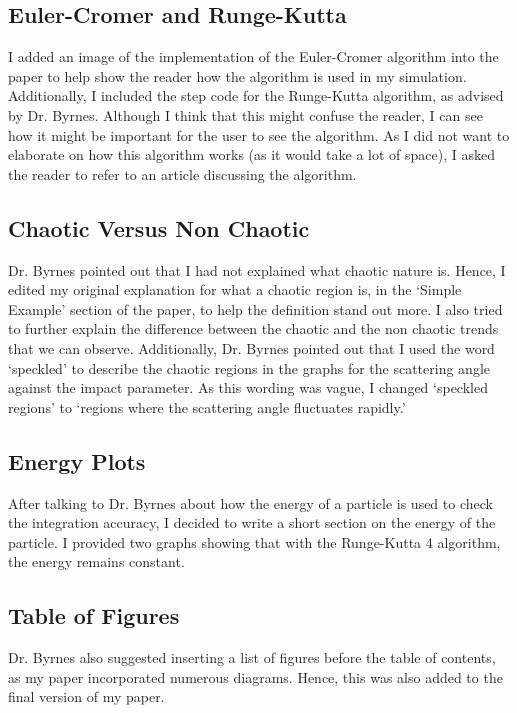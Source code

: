 \documentclass[paper=a4, fontsize=11pt]{scrartcl} %
\numberwithin{equation}{section} %
\numberwithin{figure}{section} %
\numberwithin{table}{section} %
\begin{document}
	\subsection{Euler-Cromer and Runge-Kutta}
	I added an image of the implementation of the Euler-Cromer algorithm into the paper to help show the reader how the algorithm is used in my simulation. Additionally, I included the step code for the Runge-Kutta algorithm, as advised by Dr. Byrnes. Although I think that this might confuse the reader, I can see how it might be important for the user to see the algorithm. As I did not want to elaborate on how this algorithm works (as it would take a lot of space), I asked the reader to refer to an article discussing the algorithm.
	
	\subsection{Chaotic Versus Non Chaotic}
	Dr. Byrnes pointed out that I had not explained what chaotic nature is. Hence, I edited my original explanation for what a chaotic region is, in the `Simple Example' section of the paper, to help the definition stand out more. I also tried to further explain the difference between the chaotic and the non chaotic trends that we can observe. Additionally, Dr. Byrnes pointed out that I used the word `speckled' to describe the chaotic regions in the graphs for the scattering angle against the impact parameter. As this wording was vague, I changed `speckled regions' to `regions where the scattering angle fluctuates rapidly.' 
	
	\subsection{Energy Plots}
	After talking to Dr. Byrnes about how the energy of a particle is used to check the integration accuracy, I decided to write a short section on the energy of the particle. I provided two graphs showing that with the Runge-Kutta 4 algorithm, the energy remains constant. \\
	
	
	\subsection{Table of Figures}
	Dr. Byrnes also suggested inserting a list of figures before the table of contents, as my paper incorporated numerous diagrams. Hence, this was also added to the final version of my paper.
	
\end{document}

